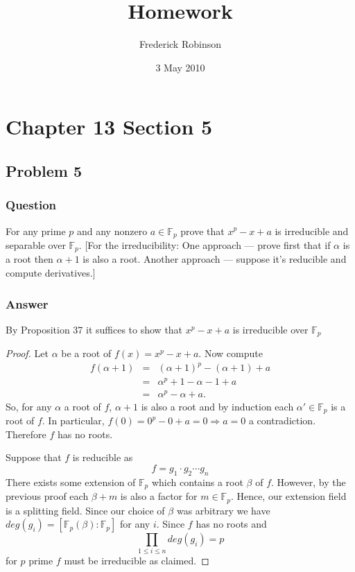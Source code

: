 \documentclass[10pt]{article}
\title{Homework}
\author{Frederick Robinson}
\date{3 May 2010}
\begin{document}

   \maketitle

\setcounter{tocdepth}{2} 


\section{Chapter 13 Section 5}
\subsection{Problem 5}
\subsubsection{Question}
For any prime $p$ and any nonzero $a \in \mathbb{F}_p$ prove that $x^p-x+a$ is irreducible and separable over $\mathbb{F}_p$. [For the irreducibility: One approach --- prove first that if $\alpha$ is a root then $\alpha+1$ is also a root. Another approach --- suppose it's reducible and compute derivatives.]
\subsubsection{Answer}
By Proposition 37 it suffices to show that $x^p-x+a$ is irreducible over $\mathbb{F}_p$
\begin{proof}
Let $\alpha$ be a root of $f(x) = x^p-x+a$. Now compute 
\begin{eqnarray*}f(\alpha+1)&=&(\alpha+1)^p-(\alpha+1)+a \\ &=&\alpha^p+1-\alpha-1+a \\ &=&\alpha^p-\alpha+a.\end{eqnarray*}
So, for any $\alpha$ a root of $f$, $\alpha+1$ is also a root and by induction each $\alpha' \in \mathbb{F}_p$ is a root of $f$. In particular, $f(0)=0^p-0+a=0 \Rightarrow a=0$ a contradiction. Therefore $f$ has no roots.

Suppose that $f$ is reducible as 
\[f=g_1\cdot g_2 \cdots g_n\]
There exists some extension of $\mathbb{F}_p$ which contains a root $\beta$ of $f$. However, by the previous proof each $\beta+m$ is also a factor for $m \in \mathbb{F}_p$. Hence, our extension field is a splitting field. Since our choice of $\beta$ was arbitrary we have $deg (g_i) = [\mathbb{F}_p(\beta):\mathbb{F}_p]$ for any $i$. Since $f$ has no roots  and 
\[\prod_{1 \leq i \leq n} deg(g_i)=p\]
for $p$ prime $f$ must be irreducible as claimed.
\end{proof}
\end{document}
